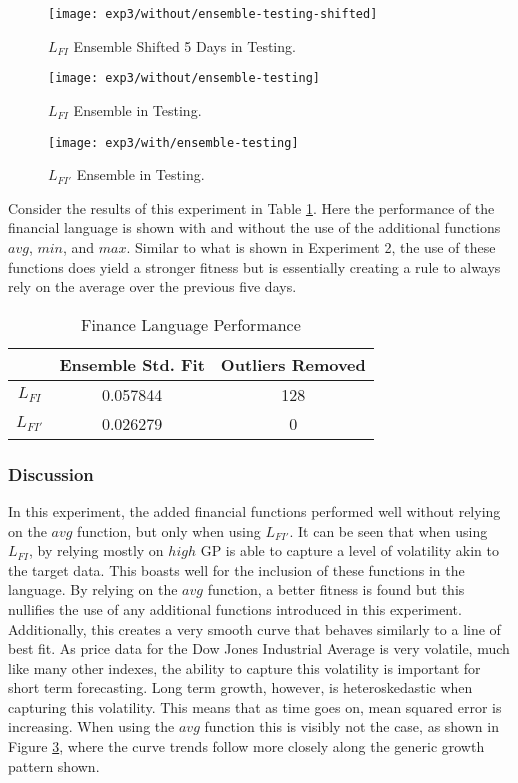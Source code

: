 \documentclass[12pt, letterpaper]{article}
\begin{document}
\begin{figure}[!htb]
\centering
\texttt{[image: exp3/without/ensemble-testing-shifted]}
\caption{ $L_{FI}$ Ensemble Shifted 5 Days in Testing.}
\label{exp3-lag-shown}
\end{figure}

\begin{figure}[!htb]
\centering
\texttt{[image: exp3/without/ensemble-testing]}
\caption{ $L_{FI}$ Ensemble in Testing.}
\label{exp3-ens-without}
\end{figure}

\begin{figure}[!htb]
\centering
\texttt{[image: exp3/with/ensemble-testing]}
\caption{ $L_{FI'}$ Ensemble in Testing.}
\label{exp3-ens-with}
\end{figure}

\textrm{ \indent Consider the results of this experiment in Table \ref{exp3-results}. Here the performance of the financial language is shown with and without the use of the additional functions $avg$, $min$, and $max$. Similar to what is shown in Experiment 2, the use of these functions does yield a stronger fitness but is essentially creating a rule to always rely on the average over the previous five days.   }

\begin{table}[!ht]
\centering
\begin{tabular}{||c|c|c||}
\hline
 & \textbf{Ensemble Std. Fit} & \textbf{Outliers Removed} \\
\hline
$L_{FI}$ & 0.057844 & 128 \\
\hline
$L_{FI'}$ & 0.026279 & 0 \\
\hline
\end{tabular}
\caption{Finance Language Performance}
\label{exp3-results}
\end{table}

\subsubsection{Discussion}

\textrm{ \indent In this experiment, the added financial functions performed well without relying on the $avg$ function, but only when using $L_{FI'}$. It can be seen that when using $L_{FI}$, by relying mostly on $high$ GP is able to capture a level of volatility akin to the target data. This boasts well for the inclusion of these functions in the language. By relying on the $avg$ function, a better fitness is found but this nullifies the use of any additional functions introduced in this experiment. Additionally, this creates a very smooth curve that behaves similarly to a line of best fit. As price data for the Dow Jones Industrial Average is very volatile, much like many other indexes, the ability to capture this volatility is important for short term forecasting. Long term growth, however, is heteroskedastic when capturing this volatility. This means that as time goes on, mean squared error is increasing. When using the $avg$ function this is visibly not the case, as shown in Figure \ref{exp3-ens-with}, where the curve trends follow more closely along the generic growth pattern shown. }
\end{document}
